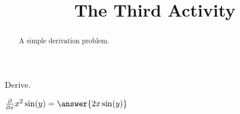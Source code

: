 \documentclass{ximera}
\title{The Third Activity}
\begin{document}
  
\begin{abstract}  
A simple derivation problem.
\end{abstract}  
\maketitle    
  Derive.
\begin{question}  
         $ \frac{\partial}{\partial x} x^2\sin(y) =  \answer{2x\sin(y)}$  
    \end{question} 
\end{document}
